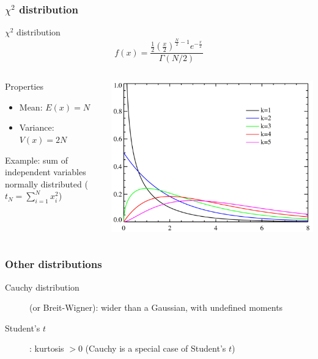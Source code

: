\documentclass[9pt]{beamer}
\begin{document}
\begin{frame}
 \frametitle{$\chi^2$ distribution}
 
 \begin{block}{$\chi^2$ distribution}
  $$f(x) = \frac{\frac{1}{2} \left( \frac{x}{2} \right)^{\frac{N}{2}-1} e^{-\frac{x}{2}}}{\Gamma(N/2)}$$
 \end{block}
  
 \begin{columns}
  \begin{column}{0.6\textwidth}
   
 \begin{block}{Properties}
  \begin{itemize}
   \item Mean: $E(x) = N$
   \item Variance: $V(x) = 2N$
  \end{itemize}
 \end{block}
 
 Example: sum of independent variables normally distributed ($t_N = \sum_{i=1}^{N} x_i^2$)
  \end{column}
  \begin{column}{0.4\textwidth}
   \includegraphics[width=\textwidth]{../figures/Chi-square_distributionPDF.png}
  \end{column}

 \end{columns}


\end{frame}


\begin{frame}
 \frametitle{Other distributions}
 
 \begin{description}
  \item[Cauchy distribution] (or Breit-Wigner): wider than a Gaussian, with undefined moments
  \item[Student's $t$]: kurtosis $>0$ (Cauchy is a special case of Student's $t$)
 \end{description}

\end{frame}
\end{document}

